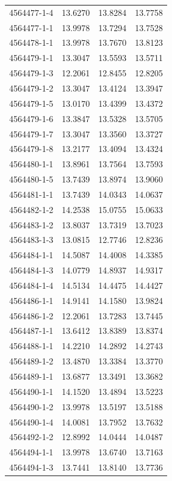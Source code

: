 \begin{longtable}{lrrr}
4564477-1-4 & 13.6270 & 13.8284 & 13.7758 \\
4564477-1-1 & 13.9978 & 13.7294 & 13.7528 \\
4564478-1-1 & 13.9978 & 13.7670 & 13.8123 \\
4564479-1-1 & 13.3047 & 13.5593 & 13.5711 \\
4564479-1-3 & 12.2061 & 12.8455 & 12.8205 \\
4564479-1-2 & 13.3047 & 13.4124 & 13.3947 \\
4564479-1-5 & 13.0170 & 13.4399 & 13.4372 \\
4564479-1-6 & 13.3847 & 13.5328 & 13.5705 \\
4564479-1-7 & 13.3047 & 13.3560 & 13.3727 \\
4564479-1-8 & 13.2177 & 13.4094 & 13.4324 \\
4564480-1-1 & 13.8961 & 13.7564 & 13.7593 \\
4564480-1-5 & 13.7439 & 13.8974 & 13.9060 \\
4564481-1-1 & 13.7439 & 14.0343 & 14.0637 \\
4564482-1-2 & 14.2538 & 15.0755 & 15.0633 \\
4564483-1-2 & 13.8037 & 13.7319 & 13.7023 \\
4564483-1-3 & 13.0815 & 12.7746 & 12.8236 \\
4564484-1-1 & 14.5087 & 14.4008 & 14.3385 \\
4564484-1-3 & 14.0779 & 14.8937 & 14.9317 \\
4564484-1-4 & 14.5134 & 14.4475 & 14.4427 \\
4564486-1-1 & 14.9141 & 14.1580 & 13.9824 \\
4564486-1-2 & 12.2061 & 13.7283 & 13.7445 \\
4564487-1-1 & 13.6412 & 13.8389 & 13.8374 \\
4564488-1-1 & 14.2210 & 14.2892 & 14.2743 \\
4564489-1-2 & 13.4870 & 13.3384 & 13.3770 \\
4564489-1-1 & 13.6877 & 13.3491 & 13.3682 \\
4564490-1-1 & 14.1520 & 13.4894 & 13.5223 \\
4564490-1-2 & 13.9978 & 13.5197 & 13.5188 \\
4564490-1-4 & 14.0081 & 13.7952 & 13.7632 \\
4564492-1-2 & 12.8992 & 14.0444 & 14.0487 \\
4564494-1-1 & 13.9978 & 13.6740 & 13.7163 \\
4564494-1-3 & 13.7441 & 13.8140 & 13.7736 \\

\end{longtable}
